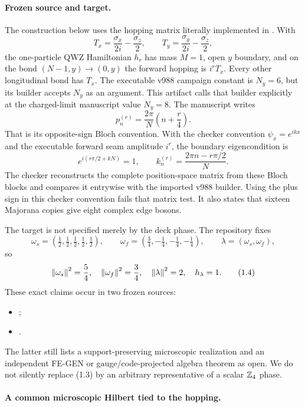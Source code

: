\paragraph{Frozen source and target.}

The construction below uses the hopping matrix literally implemented in
.  With
\[
 T_x=\frac{\sigma_x}{2i}-\frac{\sigma_z}{2},\qquad
 T_y=\frac{\sigma_y}{2i}-\frac{\sigma_z}{2},
\]
the one-particle QWZ Hamiltonian $h_r$ has mass $M=1$, open $y$ boundary,
and on the bond $(N-1,y)\to(0,y)$ the forward hopping is $i^rT_x$.
Every other longitudinal bond has $T_x$.  The executable v988 campaign
constant is $N_y=6$, but its builder accepts $N_y$ as an argument.  This
artifact calls that builder explicitly at the charged-limit manuscript value
$N_y=8$.  The manuscript writes
\[
 p_n^{(r)}=\frac{2\pi}{N}\left(n+\frac r4\right).
\tag{1.1}
\]
That is its opposite-sign Bloch convention.  With the checker convention
$\psi_x=e^{ikx}$ and the executable forward seam amplitude $i^r$, the
boundary eigencondition is
\[
 e^{i(r\pi/2+kN)}=1,\qquad
 k_n^{(r)}=\frac{2\pi n-r\pi/2}{N}.
\tag{1.2}
\]
The checker reconstructs the complete position-space matrix from these Bloch
blocks and compares it entrywise with the imported v988 builder.  Using the
plus sign in this checker convention fails that matrix test.
It also states that sixteen Majorana copies give eight complex edge bosons.

The target is not specified merely by the deck phase.  The repository fixes
\[
 \omega_s=\left(\tfrac12,\tfrac12,\tfrac12,\tfrac12,\tfrac12\right),
 \qquad
 \omega_f=\left(\tfrac34,-\tfrac14,-\tfrac14,-\tfrac14\right),
 \qquad
 \lambda=(\omega_s,\omega_f),
\tag{1.3}
\]
so
\[
 \left\lVert \omega_s\right\rVert^2=\frac54,\quad
 \left\lVert \omega_f\right\rVert^2=\frac34,\quad
 \left\lVert \lambda\right\rVert^2=2,\quad h_\lambda=1.
\tag{1.4}
\]
These exact claims occur in two frozen sources:
\begin{itemize}[nosep,leftmargin=2em]
\item {};
\item {}.
\end{itemize}
The latter still lists a support-preserving microscopic realization and an
independent FE-GEN or gauge/code-projected algebra theorem as open.  We do not
silently replace (1.3) by an arbitrary representative of a scalar $\mathbb Z_4$
phase.

\paragraph{A common microscopic Hilbert tied to the hopping.}

